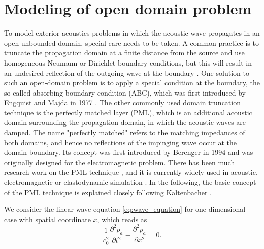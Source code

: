 \section{Modeling of open domain problem}

To model exterior acoustics problems in which the acoustic wave propagates in an open unbounded domain, special care needs to be taken.
A common practice is to truncate the propagation domain at a finite distance from the source and use homogeneous Neumann or Dirichlet boundary conditions, but this will result in an undesired reflection of the outgoing wave at the boundary \cite{nataf_absorbing_2013, kaltenbacher_numerical_2007}. One solution to such an open-domain problem is to apply a special condition at the boundary, the so-called absorbing boundary condition (ABC), which was first introduced by Engquist and Majda in 1977 \cite{Engquist_ABC_1977}. The other commonly used domain truncation technique is the perfectly matched layer (PML), which is an additional acoustic domain surrounding the propagation domain, in which the acoustic waves are damped. The name "perfectly matched" refers to the matching impedances of both domains, and hence no reflections of the impinging wave occur at the domain boundary. Its concept was first introduced by Berenger in 1994 \cite{BERENGER_PML_1994} and was originally designed for the electromagnetic problem. There has been much research work on the PML-technique \cite{kaltenbacher_numerical_2007}, and it is currently widely used in acoustic, electromagnetic or elastodynamic simulation \cite{nataf_absorbing_2013}. In the following, the basic concept of the PML technique is explained closely following Kaltenbacher \cite{kaltenbacher_numerical_2007, KALTENBACHER_PML_2013}.

We consider the linear wave equation \cref{eq:wave_equation} for one dimensional case with spatial coordinate $x$, which reads as 
\begin{equation}
	\frac{1}{c_0^2}\frac{\partial^2 p_a}{\partial t^2} -	\frac{\partial^2 p_a}{\partial x^2} = 0\text{.} \label{eq:1d_wave_equation}
\end{equation}

